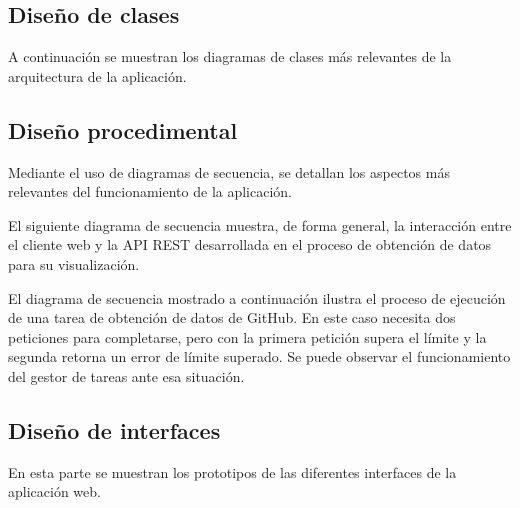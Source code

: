 
\subsection{Diseño de clases}

A continuación se muestran los diagramas de clases más relevantes de la arquitectura de la aplicación.






\subsection{Diseño procedimental}

Mediante el uso de diagramas de secuencia, se detallan los aspectos más relevantes del funcionamiento de la aplicación.

El siguiente diagrama de secuencia muestra, de forma general, la interacción entre el cliente web y la API REST desarrollada en el proceso de obtención de datos para su visualización.


El diagrama de secuencia mostrado a continuación ilustra el proceso de ejecución de una tarea de obtención de datos de GitHub. En este caso necesita dos peticiones para completarse, pero con la primera petición supera el límite y la segunda retorna un error de límite superado. Se puede observar el funcionamiento del gestor de tareas ante esa situación.


\subsection{Diseño de interfaces}

En esta parte se muestran los prototipos de las diferentes interfaces de la aplicación web.








